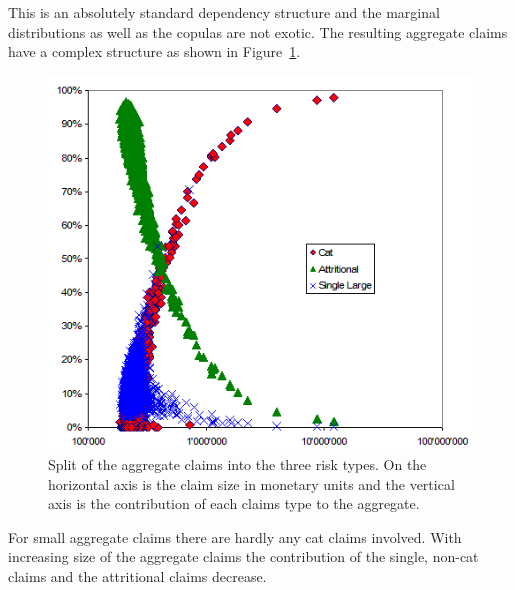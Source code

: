This is an absolutely standard dependency structure and the marginal distributions as well as the copulas are not exotic. The resulting aggregate claims have a complex structure as shown in Figure~\ref{fig:simpleDepSample}.  
\begin{figure}
		\centering
		\includegraphics[scale=0.75]{images/simpleDependencySample.png}		
	\caption{Split of the aggregate claims into the three risk types. On the horizontal axis is the claim size in monetary units and the vertical axis is the contribution of each claims type to the aggregate.}
	\label{fig:simpleDepSample}
\end{figure}
For small aggregate claims there are hardly any cat claims involved. With increasing size of the aggregate claims the contribution of the single, non-cat claims and the attritional claims decrease.